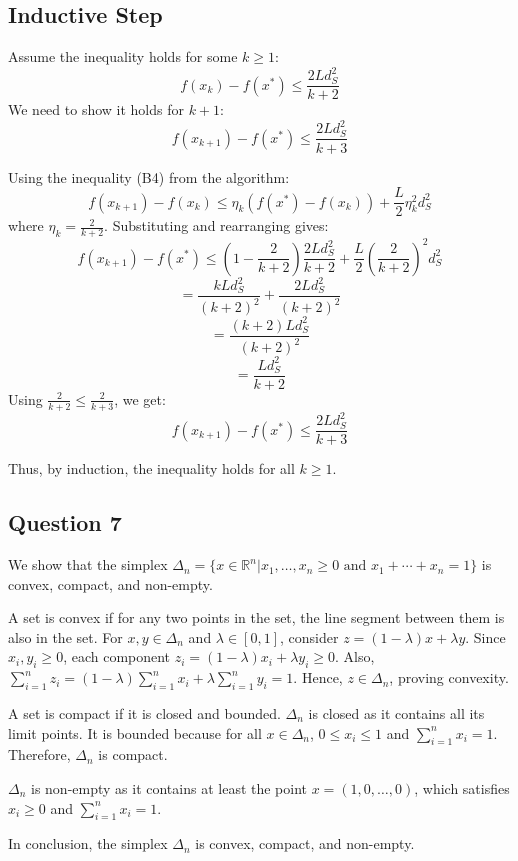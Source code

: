 \documentclass[12p]{article}
\begin{document}
\subsection*{Inductive Step}
Assume the inequality holds for some \( k \geq 1 \):
\[ f(x_k) - f(x^*) \leq \frac{2Ld^2_S}{k+2} \]
We need to show it holds for \( k+1 \):
\[ f(x_{k+1}) - f(x^*) \leq \frac{2Ld^2_S}{k+3} \]

Using the inequality (B4) from the algorithm:
\[ f(x_{k+1}) - f(x_k) \leq \eta_k (f(x^*) - f(x_k)) + \frac{L}{2} \eta_k^2 d^2_S \]
where \( \eta_k = \frac{2}{k+2} \). Substituting and rearranging gives:
\[ f(x_{k+1}) - f(x^*) \leq \left(1 - \frac{2}{k+2}\right) \frac{2Ld^2_S}{k+2} + \frac{L}{2} \left(\frac{2}{k+2}\right)^2 d^2_S \]
\[ = \frac{kLd^2_S}{(k+2)^2} + \frac{2Ld^2_S}{(k+2)^2} \]
\[ = \frac{(k+2)Ld^2_S}{(k+2)^2} \]
\[ = \frac{Ld^2_S}{k+2} \]
Using \( \frac{2}{k+2} \leq \frac{2}{k+3} \), we get:
\[ f(x_{k+1}) - f(x^*) \leq \frac{2Ld^2_S}{k+3} \]

Thus, by induction, the inequality holds for all \( k \geq 1 \).


\subsection*{Question 7} 

We show that the simplex \( \Delta_n = \{x \in \mathbb{R}^n | x_1, \ldots, x_n \geq 0 \text{ and } x_1 + \cdots + x_n = 1\} \) is convex, compact, and non-empty.

A set is convex if for any two points in the set, the line segment between them is also in the set. For \( x, y \in \Delta_n \) and \( \lambda \in [0, 1] \), consider \( z = (1 - \lambda)x + \lambda y \). Since \( x_i, y_i \geq 0 \), each component \( z_i = (1 - \lambda)x_i + \lambda y_i \geq 0 \). Also, \( \sum_{i=1}^n z_i = (1 - \lambda)\sum_{i=1}^n x_i + \lambda\sum_{i=1}^n y_i = 1 \). Hence, \( z \in \Delta_n \), proving convexity.

A set is compact if it is closed and bounded. \(\Delta_n\) is closed as it contains all its limit points. It is bounded because for all \( x \in \Delta_n \), \( 0 \leq x_i \leq 1 \) and \( \sum_{i=1}^n x_i = 1 \). Therefore, \(\Delta_n\) is compact.

\(\Delta_n\) is non-empty as it contains at least the point \( x = (1, 0, \ldots, 0) \), which satisfies \( x_i \geq 0 \) and \( \sum_{i=1}^n x_i = 1 \).

In conclusion, the simplex \( \Delta_n \) is convex, compact, and non-empty.
\end{document}
